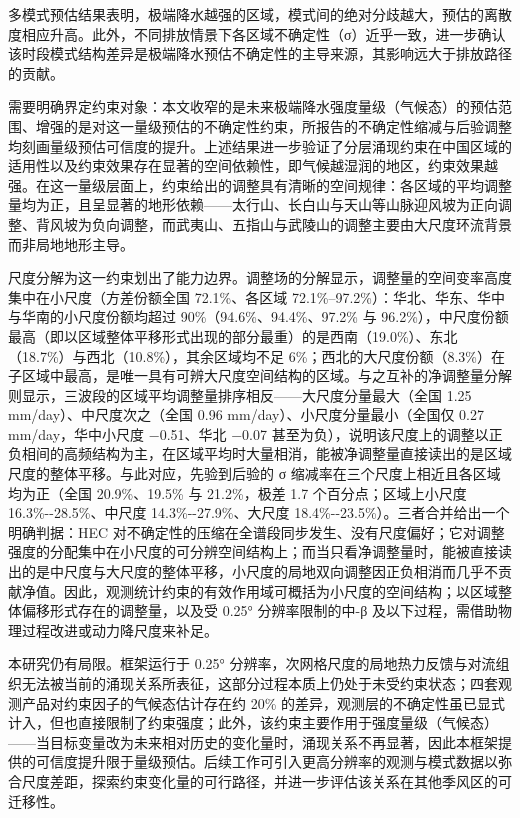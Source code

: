 \documentclass[draft]{agujournal2019}
\begin{document}
多模式预估结果表明，极端降水越强的区域，模式间的绝对分歧越大，预估的离散度相应升高。此外，不同排放情景下各区域不确定性（σ）近乎一致，进一步确认该时段模式结构差异是极端降水预估不确定性的主导来源，其影响远大于排放路径的贡献。

需要明确界定约束对象：本文收窄的是未来极端降水强度量级（气候态）的预估范围、增强的是对这一量级预估的不确定性约束，所报告的不确定性缩减与后验调整均刻画量级预估可信度的提升。上述结果进一步验证了分层涌现约束在中国区域的适用性以及约束效果存在显著的空间依赖性，即气候越湿润的地区，约束效果越强。在这一量级层面上，约束给出的调整具有清晰的空间规律：各区域的平均调整量均为正，且呈显著的地形依赖------太行山、长白山与天山等山脉迎风坡为正向调整、背风坡为负向调整，而武夷山、五指山与武陵山的调整主要由大尺度环流背景而非局地地形主导。

尺度分解为这一约束划出了能力边界。调整场的分解显示，调整量的空间变率高度集中在小尺度（方差份额全国 72.1\%、各区域 72.1\%--97.2\%）：华北、华东、华中与华南的小尺度份额均超过 90\%（94.6\%、94.4\%、97.2\% 与 96.2\%），中尺度份额最高（即以区域整体平移形式出现的部分最重）的是西南（19.0\%）、东北（18.7\%）与西北（10.8\%），其余区域均不足 6\%；西北的大尺度份额（8.3\%）在子区域中最高，是唯一具有可辨大尺度空间结构的区域。与之互补的净调整量分解则显示，三波段的区域平均调整量排序相反------大尺度分量最大（全国 1.25 mm/day）、中尺度次之（全国 0.96 mm/day）、小尺度分量最小（全国仅 0.27 mm/day，华中小尺度 −0.51、华北 −0.07 甚至为负），说明该尺度上的调整以正负相间的高频结构为主，在区域平均时大量相消，能被净调整量直接读出的是区域尺度的整体平移。与此对应，先验到后验的 σ 缩减率在三个尺度上相近且各区域均为正（全国 20.9\%、19.5\% 与 21.2\%，极差 1.7 个百分点；区域上小尺度 16.3\%-\/-28.5\%、中尺度 14.3\%-\/-27.9\%、大尺度 18.4\%-\/-23.5\%）。三者合并给出一个明确判据：HEC 对不确定性的压缩在全谱段同步发生、没有尺度偏好；它对调整强度的分配集中在小尺度的可分辨空间结构上；而当只看净调整量时，能被直接读出的是中尺度与大尺度的整体平移，小尺度的局地双向调整因正负相消而几乎不贡献净值。因此，观测统计约束的有效作用域可概括为小尺度的空间结构；以区域整体偏移形式存在的调整量，以及受 0.25° 分辨率限制的中-β 及以下过程，需借助物理过程改进或动力降尺度来补足。

本研究仍有局限。框架运行于 0.25° 分辨率，次网格尺度的局地热力反馈与对流组织无法被当前的涌现关系所表征，这部分过程本质上仍处于未受约束状态；四套观测产品对约束因子的气候态估计存在约 20\% 的差异，观测层的不确定性虽已显式计入，但也直接限制了约束强度；此外，该约束主要作用于强度量级（气候态）------当目标变量改为未来相对历史的变化量时，涌现关系不再显著，因此本框架提供的可信度提升限于量级预估。后续工作可引入更高分辨率的观测与模式数据以弥合尺度差距，探索约束变化量的可行路径，并进一步评估该关系在其他季风区的可迁移性。
\end{document}
